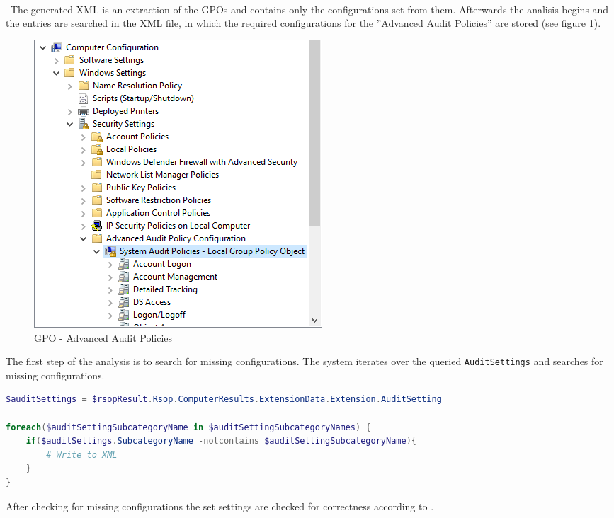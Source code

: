 \begin{multicols}{2}
    \ \\\\\\ \
    The generated XML is an extraction of the GPOs and contains only the configurations set from them.
    Afterwards the analisis begins and the entries are searched in the XML file, in which the required configurations for the ''Advanced Audit Policies'' are stored (see figure \ref{fig:AdvancedAuditPolicies}).
    \begin{figure}[H]
        \centering
        \includegraphics[width=0.7\linewidth]{assets/GetAndCheckAuditPolicies/advancedauditpolicies.png}
        \caption{GPO - Advanced Audit Policies}\label{fig:AdvancedAuditPolicies}
    \end{figure}
\end{multicols}
The first step of the analysis is to search for missing configurations. The system iterates over the queried \lstinline|AuditSettings| and searches for missing configurations.
\begin{lstlisting}[caption=GetAndCheckAuditPolicies: Search missing configurations, language=PowerShell]
$auditSettings = $rsopResult.Rsop.ComputerResults.ExtensionData.Extension.AuditSetting

foreach($auditSettingSubcategoryName in $auditSettingSubcategoryNames) {
    if($auditSettings.SubcategoryName -notcontains $auditSettingSubcategoryName){
        # Write to XML
    }
}
\end{lstlisting}

\clearpage
After checking for missing configurations the set settings are checked for correctness according to .

